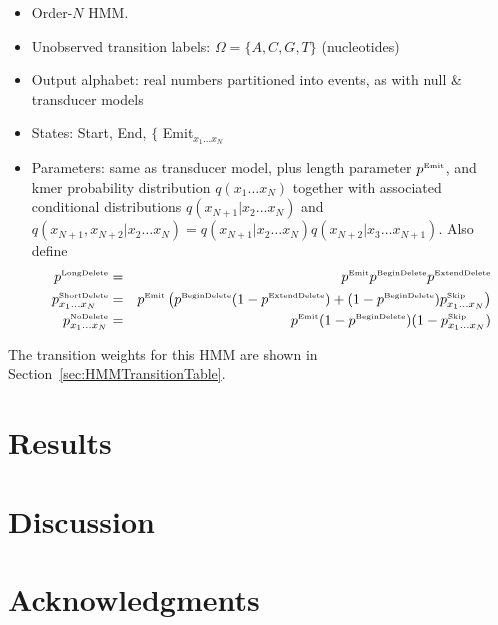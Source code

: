 \documentclass[10pt]{article}
\newcommand{\secref}[1]{Section~\ref{sec:#1}}
\begin{document}
\begin{itemize}
\item Order-$N$ HMM.
\item Unobserved transition labels: $\Omega = \{ A, C, G, T \}$ (nucleotides)
\item Output alphabet: real numbers partitioned into events, as with null \& transducer models
\item States: Start, End, $\{$ Emit${}_{x_1 \ldots x_N}$
\item Parameters: same as transducer model, plus length parameter $p^{\mbox{\tiny Emit}}$,
and kmer probability distribution
  $q(x_1\ldots x_N)$
together with associated conditional distributions
  $q(x_{N+1}|x_2\ldots x_N)$
and
  $q(x_{N+1},x_{N+2}|x_2\ldots x_N) = q(x_{N+1}|x_2\ldots x_N) q(x_{N+2}|x_3\ldots x_{N+1})$.
Also define
\begin{eqnarray*}
p^{\mbox{\tiny LongDelete}}
& = & p^{\mbox{\tiny Emit}} p^{\mbox{\tiny BeginDelete}} p^{\mbox{\tiny ExtendDelete}}
\\
p^{\mbox{\tiny ShortDelete}}_{x_1\ldots x_N}
& = & p^{\mbox{\tiny Emit}} \left( p^{\mbox{\tiny BeginDelete}} (1 - p^{\mbox{\tiny ExtendDelete}}) + (1 - p^{\mbox{\tiny BeginDelete}}) p^{\mbox{\tiny Skip}}_{x_1\ldots x_N} \right)
\\
p^{\mbox{\tiny NoDelete}}_{x_1\ldots x_N}
& = & p^{\mbox{\tiny Emit}} (1 - p^{\mbox{\tiny BeginDelete}}) (1 - p^{\mbox{\tiny Skip}}_{x_1\ldots x_N})
\end{eqnarray*}
\end{itemize}

The transition weights for this HMM are shown in \secref{HMMTransitionTable}.


\newpage
\section{Results}




\section{Discussion}


\newpage
\section{Acknowledgments}


\end{document}
